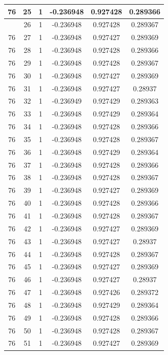 \documentclass[12pt,a4paper]{article}
\numberwithin{equation}{section}
\numberwithin{figure}{section}
\numberwithin{table}{section}
\begin{document}
\begin{longtable}{|c|c|c|c|c|c|}
76 & 25 & 1 & -0.236948 & 0.927428 & 0.289366 \\ \hline
\pagebreak
76 & 26 & 1 & -0.236948 & 0.927428 & 0.289367 \\ \hline
76 & 27 & 1 & -0.236948 & 0.927427 & 0.289369 \\ \hline
76 & 28 & 1 & -0.236948 & 0.927428 & 0.289366 \\ \hline
76 & 29 & 1 & -0.236948 & 0.927428 & 0.289367 \\ \hline
76 & 30 & 1 & -0.236948 & 0.927427 & 0.289369 \\ \hline
76 & 31 & 1 & -0.236948 & 0.927427 & 0.28937 \\ \hline
76 & 32 & 1 & -0.236949 & 0.927429 & 0.289363 \\ \hline
76 & 33 & 1 & -0.236948 & 0.927429 & 0.289364 \\ \hline
76 & 34 & 1 & -0.236948 & 0.927428 & 0.289366 \\ \hline
76 & 35 & 1 & -0.236948 & 0.927428 & 0.289367 \\ \hline
76 & 36 & 1 & -0.236948 & 0.927429 & 0.289364 \\ \hline
76 & 37 & 1 & -0.236948 & 0.927428 & 0.289366 \\ \hline
76 & 38 & 1 & -0.236948 & 0.927428 & 0.289367 \\ \hline
76 & 39 & 1 & -0.236948 & 0.927427 & 0.289369 \\ \hline
76 & 40 & 1 & -0.236948 & 0.927428 & 0.289366 \\ \hline
76 & 41 & 1 & -0.236948 & 0.927428 & 0.289367 \\ \hline
76 & 42 & 1 & -0.236948 & 0.927427 & 0.289369 \\ \hline
76 & 43 & 1 & -0.236948 & 0.927427 & 0.28937 \\ \hline
76 & 44 & 1 & -0.236948 & 0.927428 & 0.289367 \\ \hline
76 & 45 & 1 & -0.236948 & 0.927427 & 0.289369 \\ \hline
76 & 46 & 1 & -0.236948 & 0.927427 & 0.28937 \\ \hline
76 & 47 & 1 & -0.236948 & 0.927426 & 0.289372 \\ \hline
76 & 48 & 1 & -0.236948 & 0.927429 & 0.289364 \\ \hline
76 & 49 & 1 & -0.236948 & 0.927428 & 0.289366 \\ \hline
76 & 50 & 1 & -0.236948 & 0.927428 & 0.289367 \\ \hline
76 & 51 & 1 & -0.236948 & 0.927427 & 0.289369 \\ \hline

\end{longtable}
\end{document}
